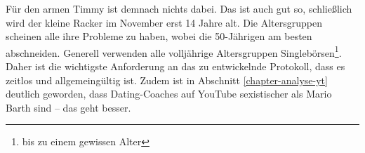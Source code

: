 Für den armen Timmy ist demnach nichts dabei.
Das ist auch gut so, schließlich wird der kleine Racker im November erst 14 Jahre alt.
Die Altersgruppen scheinen alle ihre Probleme zu haben, wobei die 50-Jährigen am besten abschneiden.
Generell verwenden alle volljährige Altersgruppen Singlebörsen\footnote{bis zu einem gewissen Alter}. 
Daher ist die wichtigste Anforderung an das zu entwickelnde Protokoll, dass es zeitlos und allgemeingültig ist.
Zudem ist in Abschnitt \ref{chapter-analyse-yt} deutlich geworden, dass Dating-Coaches auf YouTube sexistischer als Mario Barth sind – das geht besser.
